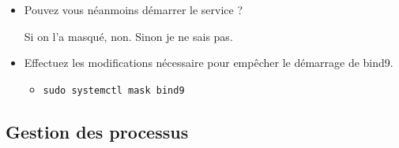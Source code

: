 \documentclass[a4paper]{article}
\begin{document}
\begin{itemize}
\item Pouvez vous néanmoins démarrer le service ?
\begin{example}
    Si on l'a masqué, non. Sinon je ne sais pas.
\end{example}

\item Effectuez les modifications nécessaire pour empêcher le démarrage de bind9.
\begin{example}
    \begin{itemize}
        \item \texttt{sudo systemctl mask bind9}
    \end{itemize}
\end{example}

\end{itemize}










\subsection{Gestion des processus}
\end{document}
